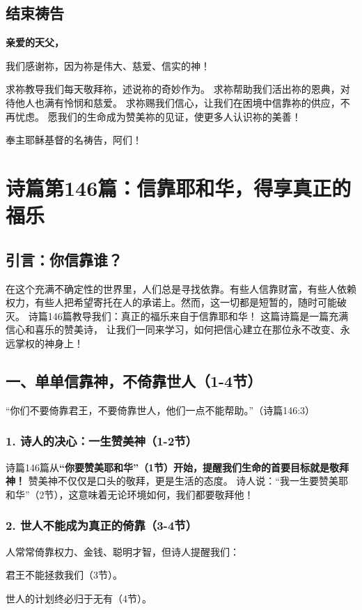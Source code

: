 \documentclass[a4paper, 12pt]{article}
\begin{document}
\subsection*{结束祷告}
\textbf{亲爱的天父，}

我们感谢祢，因为祢是伟大、慈爱、信实的神！

求祢教导我们每天敬拜祢，述说祢的奇妙作为。
求祢帮助我们活出祢的恩典，对待他人也满有怜悯和慈爱。
求祢赐我们信心，让我们在困境中信靠祢的供应，不再忧虑。
愿我们的生命成为赞美祢的见证，使更多人认识祢的美善！

奉主耶稣基督的名祷告，阿们！
\newpage
\section{诗篇第146篇：信靠耶和华，得享真正的福乐}
\subsection*{引言：你信靠谁？}
在这个充满不确定性的世界里，人们总是寻找依靠。有些人信靠财富，有些人依赖权力，有些人把希望寄托在人的承诺上。然而，这一切都是短暂的，随时可能破灭。
诗篇146篇教导我们：真正的福乐来自于信靠耶和华！ 这篇诗篇是一篇充满信心和喜乐的赞美诗，
让我们一同来学习，如何把信心建立在那位永不改变、永远掌权的神身上！

\subsection*{一、单单信靠神，不倚靠世人（1-4节）}
“你们不要倚靠君王，不要倚靠世人，他们一点不能帮助。”（诗篇146:3）

\subsubsection*{1. 诗人的决心：一生赞美神（1-2节）}
诗篇146篇从\textbf{“你要赞美耶和华”（1节）开始，提醒我们生命的首要目标就是敬拜神！}
赞美神不仅仅是口头的敬拜，更是生活的态度。
诗人说：“我一生要赞美耶和华”（2节），这意味着无论环境如何，我们都要敬拜他！
\subsubsection*{2. 世人不能成为真正的倚靠（3-4节）}
人常常倚靠权力、金钱、聪明才智，但诗人提醒我们：

君王不能拯救我们（3节）。

世人的计划终必归于无有（4节）。
\end{document}
